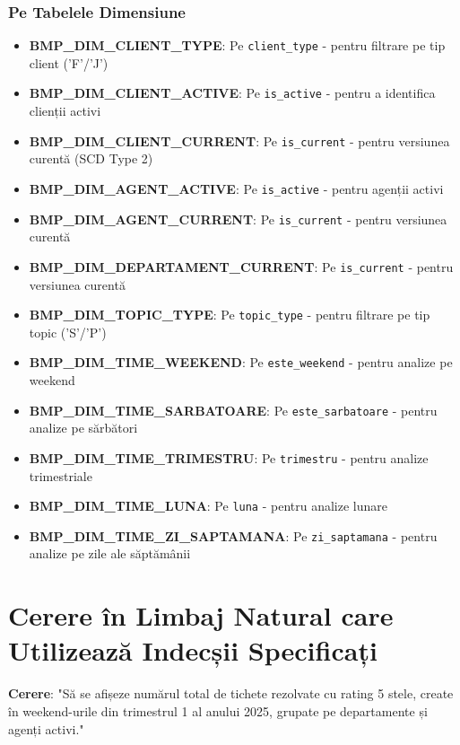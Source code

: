 \subsubsection{Pe Tabelele Dimensiune}

\begin{itemize}
    \item \textbf{BMP\_DIM\_CLIENT\_TYPE}: Pe \texttt{client\_type} - pentru filtrare pe tip client ('F'/'J')
    \item \textbf{BMP\_DIM\_CLIENT\_ACTIVE}: Pe \texttt{is\_active} - pentru a identifica clienții activi
    \item \textbf{BMP\_DIM\_CLIENT\_CURRENT}: Pe \texttt{is\_current} - pentru versiunea curentă (SCD Type 2)
    \item \textbf{BMP\_DIM\_AGENT\_ACTIVE}: Pe \texttt{is\_active} - pentru agenții activi
    \item \textbf{BMP\_DIM\_AGENT\_CURRENT}: Pe \texttt{is\_current} - pentru versiunea curentă
    \item \textbf{BMP\_DIM\_DEPARTAMENT\_CURRENT}: Pe \texttt{is\_current} - pentru versiunea curentă
    \item \textbf{BMP\_DIM\_TOPIC\_TYPE}: Pe \texttt{topic\_type} - pentru filtrare pe tip topic ('S'/'P')
    \item \textbf{BMP\_DIM\_TIME\_WEEKEND}: Pe \texttt{este\_weekend} - pentru analize pe weekend
    \item \textbf{BMP\_DIM\_TIME\_SARBATOARE}: Pe \texttt{este\_sarbatoare} - pentru analize pe sărbători
    \item \textbf{BMP\_DIM\_TIME\_TRIMESTRU}: Pe \texttt{trimestru} - pentru analize trimestriale
    \item \textbf{BMP\_DIM\_TIME\_LUNA}: Pe \texttt{luna} - pentru analize lunare
    \item \textbf{BMP\_DIM\_TIME\_ZI\_SAPTAMANA}: Pe \texttt{zi\_saptamana} - pentru analize pe zile ale săptămânii
\end{itemize}

\section{Cerere în Limbaj Natural care Utilizează Indecșii Specificați}

\textbf{Cerere}: "Să se afișeze numărul total de tichete rezolvate cu rating 5 stele, create în weekend-urile din trimestrul 1 al anului 2025, grupate pe departamente și agenți activi."

